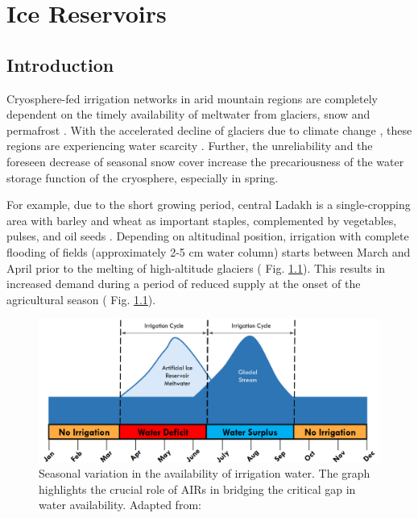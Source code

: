 \chapter{Ice Reservoirs}


\section{Introduction}

Cryosphere-fed irrigation networks in arid mountain regions are completely dependent on the timely availability
of meltwater from glaciers, snow and permafrost \citep{immerzeelImportanceVulnerabilityWorld2020,
farhanHydrologicalRegimesConjunction2015, tveitenGlacierGrowingLocal2007}. With the accelerated decline of
glaciers due to climate change \citep{nusserLocalKnowledgeGlobal2016}, these regions are experiencing water
scarcity \citep{norphelSnowWaterHarvesting2015, mukhopadhyayReevaluationSnowmeltGlacial2015}. Further, the
unreliability and the foreseen decrease of seasonal snow cover \citep{chevuturiClimateChangeLeh2018} increase
the precariousness of the water storage function of the cryosphere, especially in spring.

For example, due to the short growing period, central Ladakh is a single-cropping area with barley and wheat as
important staples, complemented by vegetables, pulses, and oil seeds
\citep{nusserSociohydrologyArtificialGlaciers2019}. Depending on altitudinal position, irrigation with complete
flooding of fields (approximately 2-5 cm water column) starts between March and April prior to the melting of
high-altitude glaciers ( Fig. \ref{fig:irrigation_cycles}). This results in increased demand during a period of
reduced supply at the onset of the agricultural season ( Fig. \ref{fig:irrigation_cycles}).

\begin{figure}[htb]
\centering
\includegraphics[width=12cm]{figs/irrigation_cycles.png}
\caption{Seasonal variation in the availability of irrigation water. The graph highlights the crucial role of
AIRs in bridging the critical gap in water availability. Adapted from: \cite{nusserLocalKnowledgeGlobal2016}}
\label{fig:irrigation_cycles}
\end{figure}

